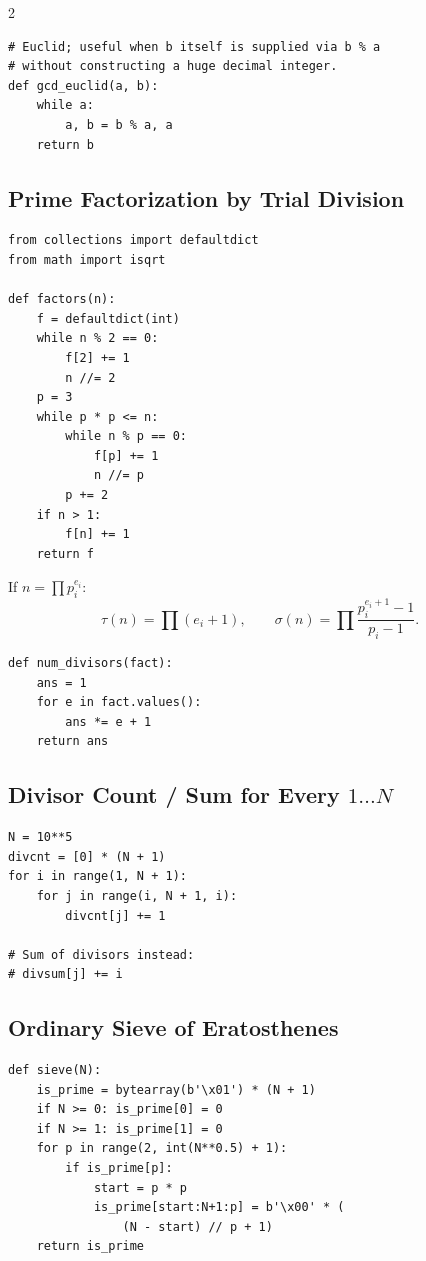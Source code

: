 \documentclass[9pt,a4paper]{extarticle}
\begin{document}
\begin{multicols}{2}
\begin{lstlisting}
# Euclid; useful when b itself is supplied via b % a
# without constructing a huge decimal integer.
def gcd_euclid(a, b):
    while a:
        a, b = b % a, a
    return b
\end{lstlisting}

\subsection{Prime Factorization by Trial Division}
\begin{lstlisting}
from collections import defaultdict
from math import isqrt

def factors(n):
    f = defaultdict(int)
    while n % 2 == 0:
        f[2] += 1
        n //= 2
    p = 3
    while p * p <= n:
        while n % p == 0:
            f[p] += 1
            n //= p
        p += 2
    if n > 1:
        f[n] += 1
    return f
\end{lstlisting}

If $n=\prod p_i^{e_i}$:
\[
\tau(n)=\prod(e_i+1),\qquad
\sigma(n)=\prod\frac{p_i^{e_i+1}-1}{p_i-1}.
\]

\begin{lstlisting}
def num_divisors(fact):
    ans = 1
    for e in fact.values():
        ans *= e + 1
    return ans
\end{lstlisting}

\subsection{Divisor Count / Sum for Every $1\ldots N$}
\begin{lstlisting}
N = 10**5
divcnt = [0] * (N + 1)
for i in range(1, N + 1):
    for j in range(i, N + 1, i):
        divcnt[j] += 1

# Sum of divisors instead:
# divsum[j] += i
\end{lstlisting}

\subsection{Ordinary Sieve of Eratosthenes}
\begin{lstlisting}
def sieve(N):
    is_prime = bytearray(b'\x01') * (N + 1)
    if N >= 0: is_prime[0] = 0
    if N >= 1: is_prime[1] = 0
    for p in range(2, int(N**0.5) + 1):
        if is_prime[p]:
            start = p * p
            is_prime[start:N+1:p] = b'\x00' * (
                (N - start) // p + 1)
    return is_prime
\end{lstlisting}


\end{multicols}
\end{document}

